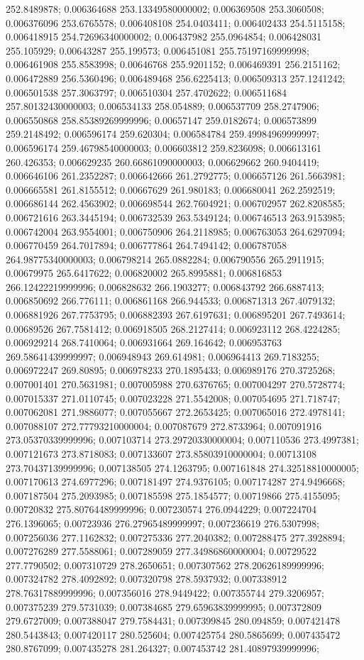 252.8489878; 0.006364688 253.13349580000002; 0.006369508 253.3060508; 0.006376096 253.6765578; 0.006408108 254.0403411; 0.006402433 254.5115158; 0.006418915 254.72696340000002; 0.006437982 255.0964854; 0.006428031 255.105929; 0.00643287 255.199573; 0.006451081 255.75197169999998; 0.006461908 255.8583998; 0.00646768 255.9201152; 0.006469391 256.2151162; 0.006472889 256.5360496; 0.006489468 256.6225413; 0.006509313 257.1241242; 0.006501538 257.3063797; 0.006510304 257.4702622; 0.006511684 257.80132430000003; 0.006534133 258.054889; 0.006537709 258.2747906; 0.006550868 258.85389269999996; 0.00657147 259.0182674; 0.006573899 259.2148492; 0.006596174 259.620304; 0.006584784 259.49984969999997; 0.006596174 259.46798540000003; 0.006603812 259.8236098; 0.006613161 260.426353; 0.006629235 260.66861090000003; 0.006629662 260.9404419; 0.006646106 261.2352287; 0.006642666 261.2792775; 0.006657126 261.5663981; 0.006665581 261.8155512; 0.00667629 261.980183; 0.006680041 262.2592519; 0.006686144 262.4563902; 0.006698544 262.7604921; 0.006702957 262.8208585; 0.006721616 263.3445194; 0.006732539 263.5349124; 0.006746513 263.9153985; 0.006742004 263.9554001; 0.006750906 264.2118985; 0.006763053 264.6297094; 0.006770459 264.7017894; 0.006777864 264.7494142; 0.006787058 264.98775340000003; 0.006798214 265.0882284; 0.006790556 265.2911915; 0.00679975 265.6417622; 0.006820002 265.8995881; 0.006816853 266.12422219999996; 0.006828632 266.1903277; 0.006843792 266.6887413; 0.006850692 266.776111; 0.006861168 266.944533; 0.006871313 267.4079132; 0.006881926 267.7753795; 0.006882393 267.6197631; 0.006895201 267.7493614; 0.00689526 267.7581412; 0.006918505 268.2127414; 0.006923112 268.4224285; 0.006929214 268.7410064; 0.006931664 269.164642; 0.006953763 269.58641439999997; 0.006948943 269.614981; 0.006964413 269.7183255; 0.006972247 269.80895; 0.006978233 270.1895433; 0.006989176 270.3725268; 0.007001401 270.5631981; 0.007005988 270.6376765; 0.007004297 270.5728774; 0.007015337 271.0110745; 0.007023228 271.5542008; 0.007054695 271.718747; 0.007062081 271.9886077; 0.007055667 272.2653425; 0.007065016 272.4978141; 0.007088107 272.77793210000004; 0.007087679 272.8733964; 0.007091916 273.05370339999996; 0.007103714 273.29720330000004; 0.007110536 273.4997381; 0.007121673 273.8718083; 0.007133607 273.85803910000004; 0.00713108 273.70437139999996; 0.007138505 274.1263795; 0.007161848 274.32518810000005; 0.007170613 274.6977296; 0.007181497 274.9376105; 0.007174287 274.9496668; 0.007187504 275.2093985; 0.007185598 275.1854577; 0.00719866 275.4155095; 0.00720832 275.80764489999996; 0.007230574 276.0944229; 0.007224704 276.1396065; 0.00723936 276.27965489999997; 0.007236619 276.5307998; 0.007256036 277.1162832; 0.007275336 277.2040382; 0.007288475 277.3928894; 0.007276289 277.5588061; 0.007289059 277.34986860000004; 0.00729522 277.7790502; 0.007310729 278.2650651; 0.007307562 278.20626189999996; 0.007324782 278.4092892; 0.007320798 278.5937932; 0.007338912 278.76317889999996; 0.007356016 278.9449422; 0.007355744 279.3206957; 0.007375239 279.5731039; 0.007384685 279.65963839999995; 0.007372809 279.6727009; 0.007388047 279.7584431; 0.007399845 280.094859; 0.007421478 280.5443843; 0.007420117 280.525604; 0.007425754 280.5865699; 0.007435472 280.8767099; 0.007435278 281.264327; 0.007453742 281.40897939999996; 